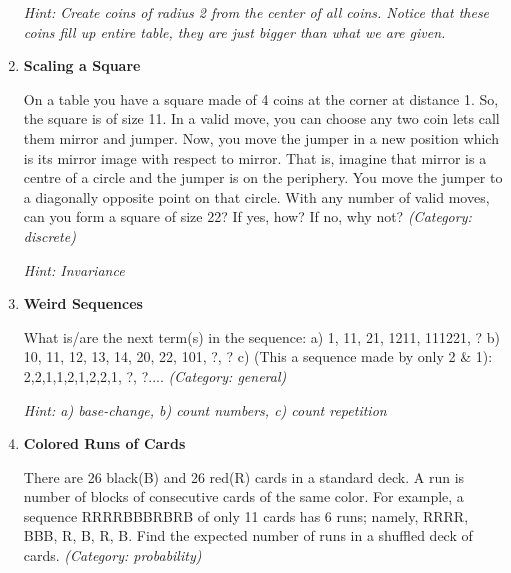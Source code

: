 \begin{enumerate}
\small\emph{Hint: Create coins of radius 2 from the center of all coins. Notice that these coins fill up entire table, they are just bigger than what we are given.}





\item \textbf{Scaling a Square}

On a table you have a square made of 4 coins at the corner at distance 1. So, the square is of size 11.  In a valid move, you can choose any two coin lets call them mirror and jumper. Now, you move the jumper in a new position which is its mirror image with respect to mirror. That is, imagine that mirror is a centre of a circle and the jumper is on the periphery. You move the jumper to a diagonally opposite point on that circle. With any number of valid moves, can you form a square of size 22? If yes, how? If no, why not?
\small\emph{(Category: discrete)}

\small\emph{Hint: Invariance}





\item \textbf{Weird Sequences}

What is/are the next term(s) in the sequence:
a) 1, 11, 21, 1211, 111221, ?
b) 10, 11, 12, 13, 14, 20, 22, 101, ?, ?
c) (This a sequence made by only 2 \& 1): 2,2,1,1,2,1,2,2,1, ?, ?....
\small\emph{(Category: general)}

\small\emph{Hint: a) base-change, b) count numbers,  c) count repetition}





\item \textbf{Colored Runs of Cards}

There are 26 black(B) and 26 red(R) cards in a standard deck. A run is number of blocks of consecutive cards of the same color. For example, a sequence RRRRBBBRBRB of only 11 cards has 6 runs; namely, RRRR, BBB, R, B, R, B. Find the expected number of runs in a shuffled deck of cards.
\small\emph{(Category: probability)}


\end{enumerate}
